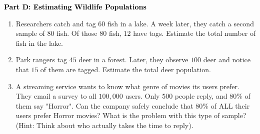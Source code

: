 \documentclass[12pt, letterpaper, fleqn]{article}
\begin{document}
\begin{tcolorbox}[colback=customteal!20]
\large\textcolor{black}{\textbf{Part D: Estimating Wildlife Populations}}
\end{tcolorbox}

\vspace{3mm}

\begin{enumerate}[itemsep=5.5cm, leftmargin=0.6cm, resume]
\item Researchers catch and tag $60$ fish in a lake. A week later, they catch a second sample of $80$ fish. Of those $80$ fish, $12$ have tags. Estimate the total number of fish in the lake.
\item Park rangers tag $45$ deer in a forest. Later, they observe $100$ deer and notice that $15$ of them are tagged. Estimate the total deer population.
\item A streaming service wants to know what genre of movies its users prefer. They email a survey to all $100,000$ users. Only $500$ people reply, and $80\%$ of them say "Horror". Can the company safely conclude that $80\%$ of ALL their users prefer Horror movies? What is the problem with this type of sample? (Hint: Think about who actually takes the time to reply).
\end{enumerate}
\end{document}
